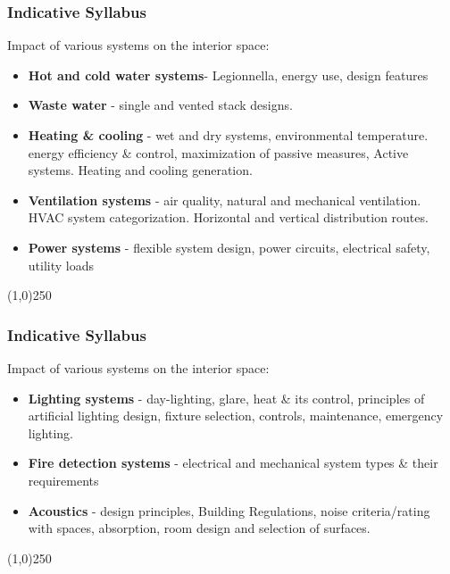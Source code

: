 \begin{frame}
\frametitle{Indicative Syllabus}
Impact of various systems on the interior space:
\begin{itemize}
	\item \textbf{Hot and cold water systems}- Legionnella, energy use, design features
	\item\textbf{Waste water} - single and vented stack designs.
	\item\textbf{Heating \& cooling} - wet and dry systems, environmental temperature. energy efficiency \& control, maximization of passive measures, Active systems. Heating and cooling generation.
	\item\textbf{Ventilation systems} - air quality, natural and mechanical ventilation. HVAC system categorization. Horizontal and vertical distribution routes.
	\item\textbf{Power systems} - flexible system design, power circuits, electrical safety, utility loads
\end{itemize}
\end{frame}
\begin{center}\line(1,0){250}\end{center}





\begin{frame}
\frametitle{Indicative Syllabus}
Impact of various systems on the interior space:
\begin{itemize}
	\item\textbf{Lighting systems} - day-lighting, glare, heat \& its control, principles of artificial lighting design, fixture selection, controls, maintenance, emergency lighting.
	\item\textbf{Fire detection systems} - electrical and mechanical system types \& their requirements
	\item\textbf{Acoustics} - design principles, Building Regulations, noise criteria/rating with spaces, absorption, room design and selection of surfaces.
\end{itemize}

\end{frame}
\begin{center}\line(1,0){250}\end{center}



